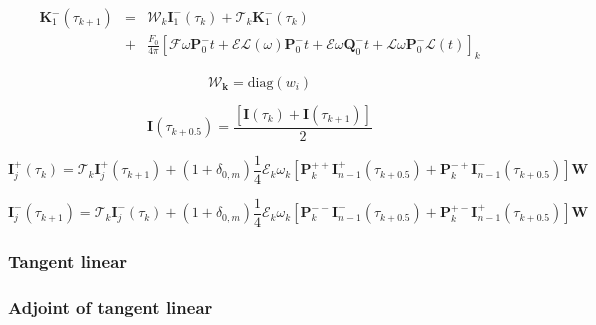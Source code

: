 \begin{eqnarray}
\mathbf{K}^{-}_{1}(\tau_{k+1}) &=& \boldsymbol{\mathcal{W}}_{k}\mathbf{I}^{-}_{1}(\tau_{k}) + \boldsymbol{\mathcal{T}}_{k}\mathbf{K}^{-}_{1}(\tau_{k}) \nonumber \\
                               &+& \frac{F_{0}}{4\pi} \left[ \boldsymbol{\mathcal{F}}\omega\mathbf{P}^{-}_{0}t + \boldsymbol{\mathcal{E}}\mathcal{L}(\omega)\mathbf{P}^{-}_{0}t + \boldsymbol{\mathcal{E}}\omega\mathbf{Q}^{-}_{0}t + \boldsymbol{\mathcal{L}}\omega\mathbf{P}^{-}_{0}\mathcal{L}(t) \right]_{k}
\label{eq:sos-forward-K_1_m}
\end{eqnarray}

\begin{equation}
\boldsymbol{\mathcal{W}_{k}} = \mathrm{diag}(w_{i})
\label{eq:sos-forward-W}
\end{equation}

\begin{equation}
\mathbf{I}(\tau_{k+0.5}) = \frac{\left[\mathbf{I}(\tau_{k}) + \mathbf{I}(\tau_{k+1})\right]}{2}
\label{eq:sos-forward-I_k_p_0_5}
\end{equation}

\begin{equation}
\mathbf{I}^{+}_{j}(\tau_{k}) = \boldsymbol{\mathcal{T}}_{k}\mathbf{I}^{+}_{j}(\tau_{k+1}) + (1 + \delta_{0,m}) \frac{1}{4}\boldsymbol{\mathcal{E}}_{k}\omega_{k}\left[\mathbf{P}^{++}_{k}\mathbf{I}^{+}_{n-1}(\tau_{k+0.5}) + \mathbf{P}^{-+}_{k}\mathbf{I}^{-}_{n-1}(\tau_{k+0.5})\right]\mathbf{W}
\label{eq:sos-forward-I_j_p}
\end{equation}

\begin{equation}
\mathbf{I}^{-}_{j}(\tau_{k+1}) = \boldsymbol{\mathcal{T}}_{k}\mathbf{I}^{-}_{j}(\tau_{k}) + (1 + \delta_{0,m}) \frac{1}{4}\boldsymbol{\mathcal{E}}_{k}\omega_{k}\left[\mathbf{P}^{--}_{k}\mathbf{I}^{-}_{n-1}(\tau_{k+0.5}) + \mathbf{P}^{+-}_{k}\mathbf{I}^{+}_{n-1}(\tau_{k+0.5})\right]\mathbf{W}
\label{eq:sos-forward-I_j_m}
\end{equation}


\subsubsection{Tangent linear}
\label{sec:sos-tangent_linear}


\subsubsection{Adjoint of tangent linear}
\label{sec:sos-adjoint_of_tangent_linear}
